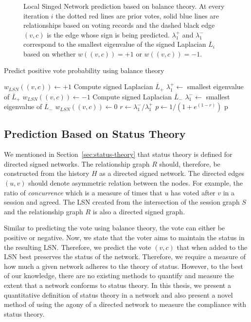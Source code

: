 \begin{figure}[!ht]
    \centering
    
    \caption{Local Singed Network prediction based on balance theory. At every iteration $i$ the dotted red lines are prior votes, solid blue lines are relationships based on voting records and the dashed black edge $(v,c)$ is the edge whose sign is being predicted. $\lambda_1^+$ and $\lambda_1^-$ correspond to the smallest eigenvalue of the signed Laplacian $\overline{L}_i$ based on whether $w((v,c))=+1$ or $w((v,c))=-1$.     }
    \label{fig:lsn-balance}
\end{figure}

\begin{algorithm}[htp]
    \DontPrintSemicolon
    \caption{Predict positive vote probability using balance theory}
    \label{alg:balance-pred}
    $w_{LSN}((v,c)) \leftarrow +1$ 
    Compute signed Laplacian $\overline{L}_+$\;
    $\lambda_1^+ \leftarrow $ smallest eigenvalue of $\overline{L}_+$\;
    $w_{LSN}((v,c)) \leftarrow -1$  
    Compute signed Laplacian $\overline{L}_-$\;
    $\lambda_{1}^- \leftarrow$ smallest eigenvalue of $\overline{L}_-$\;
    $w_{LSN}((v,c)) \leftarrow 0$ 
    $r \leftarrow {\lambda_{1}^-}/{\lambda_{1}^{+}}$\;
    $p \leftarrow 1/(1+e^{(1-r)})$\;
    \Return p
\end{algorithm}

\subsection{Prediction Based on Status Theory }
\label{subsec:prediction-based-status}
We mentioned in Section~\ref{sec:status-theory} that status theory is defined for directed signed networks.
The relationship graph $R$ should, therefore, be constructed from the history $H$ as a directed signed network.
The directed edges $(u,v)$ should denote asymmetric relation between the nodes.
For example, the ratio of \textit{concurrence} which is a measure of times that $u$ has voted after $v$ in a session and agreed.
The LSN created from the intersection of the session graph $S$ and the relationship graph $R$ is also a directed signed graph.

Similar to predicting the vote using balance theory, the vote can either be positive or negative.
Now, we state that the voter aims to maintain the status in the resulting LSN.
Therefore, we predict the vote $(v,c)$ that when added to the LSN best preserves the status of the network.
Therefore, we require a measure of how much a given network adheres to the theory of status.
However, to the best of our knowledge, there are no existing methods to quantify and measure the extent that a network conforms to status theory.
In this thesis, we present a quantitative definition of status theory in a network and also present a novel method of using the agony of a directed network to measure the compliance with status theory.

